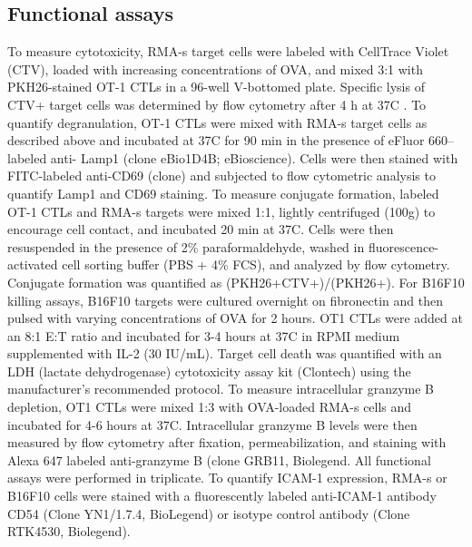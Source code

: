 \subsection{Functional assays}
To measure cytotoxicity, RMA-s target cells were labeled with CellTrace Violet (CTV), loaded with increasing concentrations of OVA, and mixed 3:1 with PKH26-stained OT-1 CTLs in a 96-well V-bottomed plate. Specific lysis of CTV+ target cells was determined by flow cytometry after 4 h at 37\degree C \cite{Purbhoo2004}. To quantify degranulation, OT-1 CTLs were mixed with RMA-s target cells as described above and incubated at 37\degree C for 90 min in the presence of eFluor 660–labeled anti- Lamp1 (clone eBio1D4B; eBioscience). Cells were then stained with FITC-labeled anti-CD69 (clone) and subjected to flow cytometric analysis to quantify Lamp1 and CD69 staining. To measure conjugate formation, labeled OT-1 CTLs and RMA-s targets were mixed 1:1, lightly centrifuged (100g) to encourage cell contact, and incubated 20 min at 37\degree C. Cells were then resuspended in the presence of 2\% paraformaldehyde, washed in fluorescence-activated cell sorting buffer (PBS + 4\% FCS), and analyzed by flow cytometry. Conjugate formation was quantified as (PKH26+CTV+)/(PKH26+). For B16F10 killing assays, B16F10 targets were cultured overnight on fibronectin and then pulsed with varying concentrations of OVA for 2 hours. OT1 CTLs were added at an 8:1 E:T ratio and incubated for 3-4 hours at 37\degree C in RPMI medium supplemented with IL-2 (30 IU/mL). Target cell death was quantified with an LDH (lactate dehydrogenase) cytotoxicity assay kit (Clontech) using the manufacturer’s recommended protocol. To measure intracellular granzyme B depletion, OT1 CTLs were mixed 1:3 with OVA-loaded RMA-s cells and incubated for 4-6 hours at 37\degree C. Intracellular granzyme B levels were then measured by flow cytometry after fixation, permeabilization, and staining with Alexa 647 labeled anti-granzyme B (clone  GRB11, Biolegend. All functional assays were performed in triplicate. To quantify ICAM-1 expression, RMA-s or B16F10 cells were stained with a fluorescently labeled anti-ICAM-1 antibody CD54 (Clone YN1/1.7.4, BioLegend) or isotype control antibody (Clone RTK4530, Biolegend). 

